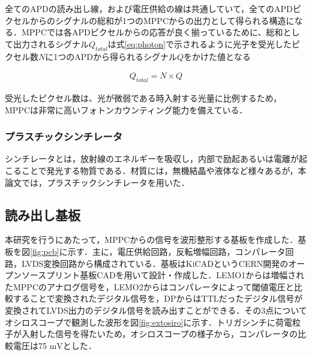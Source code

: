全てのAPDの読み出し線，および電圧供給の線は共通していて，全てのAPDピクセルからのシグナルの総和が1つのMPPCからの出力として得られる構造になる．MPPCでは各APDピクセルからの応答が良く揃っているために、総和として出力されるシグナル$Q_{total}$は式\ref{eq:photon}で示されるように光子を受光したピクセル数$N$に1つのAPDから得られるシグナル$Q$をかけた値となる

\begin{eqnarray}
  \label{eq:photon}
  Q_{total} = N \times Q
\end{eqnarray}

受光したピクセル数は、光が微弱である時入射する光量に比例するため， MPPCは非常に高いフォトンカウンティング能力を備えている．

\subsubsection*{プラスチックシンチレータ}
シンチレータとは，放射線のエネルギーを吸収し，内部で励起あるいは電離が起こることで発光する物質である．材質には，無機結晶や液体など様々あるが，本論文では，プラスチックシンチレータを用いた．

%
%
%
%
\subsection{読み出し基板}
本研究を行うにあたって，MPPCからの信号を波形整形する基板を作成した．基板を図\ref{fig:pcb}に示す．主に，電圧供給回路，反転増幅回路，コンパレータ回路，LVDS変換回路から構成されている．基板はKiCADというCERN開発のオープンソースプリント基板CADを用いて設計・作成した．LEMO1からは増幅されたMPPCのアナログ信号を，LEMO2からはコンパレータによって閾値電圧と比較することで変換されたデジタル信号を，DPからはTTLだったデジタル信号が変換されてLVDS出力のデジタル信号を読み出すことができる．その3点についてオシロスコープで観測した波形を図\ref{fig:extosiro}に示す．トリガシンチに荷電粒子が入射した信号を得たいため，オシロスコープの様子から，コンパレータの比較電圧は75 $\mathrm{mV}$とした．


